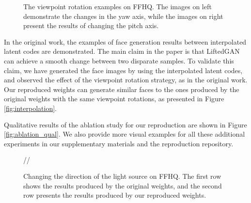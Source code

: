 \begin{figure}[h!]%
    \centering
    \qquad
    \caption{The viewpoint rotation examples on FFHQ. The images on left demonstrate the changes in the yaw axis, while the images on right present the results of changing the pitch axis.}%
    \label{fig:rotation}%
\end{figure}

In the original work, the examples of face generation results between interpolated latent codes are demonstrated. The main claim in the paper is that LiftedGAN can achieve a smooth change between two disparate samples. To validate this claim, we have generated the face images by using the interpolated latent codes, and observed the effect of the viewpoint rotation strategy, as in the original work. Our reproduced weights can generate similar faces to the ones produced by the original weights with the same viewpoint rotations, as presented in Figure \ref{fig:interpolation}. 

Qualitative results of the ablation study for our reproduction are shown in Figure \ref{fig:ablation_qual}. We also provide more visual examples for all these additional experiments in our supplementary materials and the reproduction repository.

\begin{figure}[t]
    \centering
     //
    \caption{Changing the direction of the light source on FFHQ. The first row shows the results produced by the original weights, and the second row presents the results produced by our reproduced weights.}
    \label{fig:lighting}
\end{figure}

